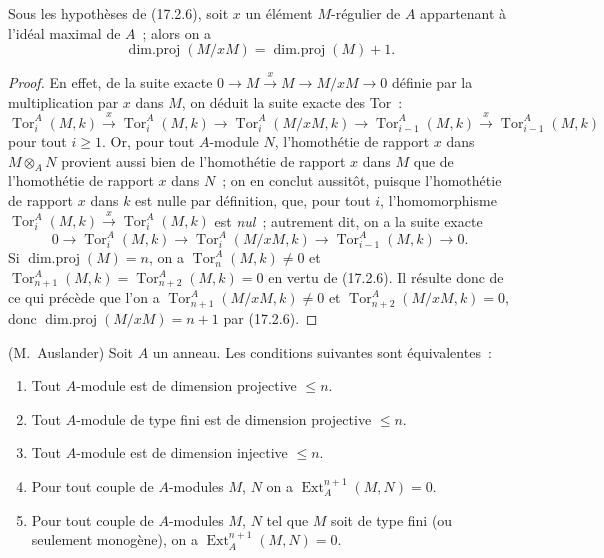 \begin{corollary}[17.2.7]
\label{0.17.2.7-fr}
Sous les hypothèses de \textup{(17.2.6)}, soit $x$ un élément $M$-régulier de $A$
appartenant à l'idéal maximal de $A$~; alors on a
\begin{equation}
\label{0.17.2.7.1-fr}
\tag{17.2.7.1}
  \operatorname{dim.proj}(M/xM)=\operatorname{dim.proj}(M)+1.
\end{equation}
\end{corollary}

\begin{proof}
En effet, de la suite exacte
$0\longrightarrow M\xrightarrow{x}M\longrightarrow M/xM\longrightarrow0$
définie par la multiplication par $x$ dans $M$, on déduit la suite exacte des
Tor~:
\[
  \operatorname{Tor}^A_i(M,k)\xrightarrow{x}
  \operatorname{Tor}^A_i(M,k)\longrightarrow
  \operatorname{Tor}^A_i(M/xM,k)\longrightarrow
  \operatorname{Tor}^A_{i-1}(M,k)\xrightarrow{x}
  \operatorname{Tor}^A_{i-1}(M,k)
\]
pour tout $i\geq1$. Or, pour tout $A$-module $N$, l'homothétie de rapport $x$
dans $M\otimes_A N$ provient aussi bien de l'homothétie de rapport $x$ dans
$M$ que de l'homothétie de rapport $x$ dans $N$~; on en conclut aussitôt,
puisque l'homothétie de rapport $x$ dans $k$ est nulle par définition, que,
pour tout $i$, l'homomorphisme
$\operatorname{Tor}^A_i(M,k)\xrightarrow{x}\operatorname{Tor}^A_i(M,k)$ est
\emph{nul}~; autrement dit, on a la suite exacte
\[
  0\longrightarrow\operatorname{Tor}^A_i(M,k)\longrightarrow
  \operatorname{Tor}^A_i(M/xM,k)\longrightarrow
  \operatorname{Tor}^A_{i-1}(M,k)\longrightarrow0.
\]
Si $\operatorname{dim.proj}(M)=n$, on a
$\operatorname{Tor}^A_n(M,k)\neq0$ et
$\operatorname{Tor}^A_{n+1}(M,k)=\operatorname{Tor}^A_{n+2}(M,k)=0$ en vertu
de (17.2.6). Il résulte donc de ce qui précède que l'on a
$\operatorname{Tor}^A_{n+1}(M/xM,k)\neq0$ et
$\operatorname{Tor}^A_{n+2}(M/xM,k)=0$, donc
$\operatorname{dim.proj}(M/xM)=n+1$ par (17.2.6).
\end{proof}

\begin{proposition}[17.2.8]
\label{0.17.2.8-fr}
\textnormal{(M.~Auslander)} Soit $A$ un anneau. Les conditions suivantes sont
équivalentes~:
\begin{enumerate}
  \item[\rm a)] Tout $A$-module est de dimension projective $\leq n$.
  \item[\rm a')] Tout $A$-module de type fini est de dimension projective
  $\leq n$.
  \item[\rm b)] Tout $A$-module est de dimension injective $\leq n$.
  \item[\rm c)] Pour tout couple de $A$-modules $M$, $N$ on a
  $\operatorname{Ext}^{n+1}_A(M,N)=0$.
  \item[\rm c')] Pour tout couple de $A$-modules $M$, $N$ tel que $M$ soit de
  type fini \textup{(ou seulement} monogène\textup{)}, on a
  $\operatorname{Ext}^{n+1}_A(M,N)=0$.
\end{enumerate}
\end{proposition}

